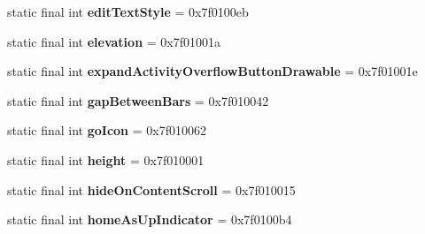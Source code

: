\begin{DoxyCompactItemize}
\item 
\hypertarget{classandroid_1_1support_1_1v7_1_1appcompat_1_1_r_1_1attr_adb21f96a96e592e622d373cf62cb5b55}{}static final int {\bfseries edit\+Text\+Style} = 0x7f0100eb\label{classandroid_1_1support_1_1v7_1_1appcompat_1_1_r_1_1attr_adb21f96a96e592e622d373cf62cb5b55}

\item 
\hypertarget{classandroid_1_1support_1_1v7_1_1appcompat_1_1_r_1_1attr_a857db0711c5ee6c5f31d51c0e1dcf793}{}static final int {\bfseries elevation} = 0x7f01001a\label{classandroid_1_1support_1_1v7_1_1appcompat_1_1_r_1_1attr_a857db0711c5ee6c5f31d51c0e1dcf793}

\item 
\hypertarget{classandroid_1_1support_1_1v7_1_1appcompat_1_1_r_1_1attr_a08db43c910c44c3cd8ba06573e44e88b}{}static final int {\bfseries expand\+Activity\+Overflow\+Button\+Drawable} = 0x7f01001e\label{classandroid_1_1support_1_1v7_1_1appcompat_1_1_r_1_1attr_a08db43c910c44c3cd8ba06573e44e88b}

\item 
\hypertarget{classandroid_1_1support_1_1v7_1_1appcompat_1_1_r_1_1attr_a37cf66ba61ecfae3c1d28ee79d9ef459}{}static final int {\bfseries gap\+Between\+Bars} = 0x7f010042\label{classandroid_1_1support_1_1v7_1_1appcompat_1_1_r_1_1attr_a37cf66ba61ecfae3c1d28ee79d9ef459}

\item 
\hypertarget{classandroid_1_1support_1_1v7_1_1appcompat_1_1_r_1_1attr_a817028431fb50ad70b0761d4813ee1dd}{}static final int {\bfseries go\+Icon} = 0x7f010062\label{classandroid_1_1support_1_1v7_1_1appcompat_1_1_r_1_1attr_a817028431fb50ad70b0761d4813ee1dd}

\item 
\hypertarget{classandroid_1_1support_1_1v7_1_1appcompat_1_1_r_1_1attr_ae2766034f35dee610b4cf8dbff1ce762}{}static final int {\bfseries height} = 0x7f010001\label{classandroid_1_1support_1_1v7_1_1appcompat_1_1_r_1_1attr_ae2766034f35dee610b4cf8dbff1ce762}

\item 
\hypertarget{classandroid_1_1support_1_1v7_1_1appcompat_1_1_r_1_1attr_af0d56ba3b5798b633d10f4b184f4d98f}{}static final int {\bfseries hide\+On\+Content\+Scroll} = 0x7f010015\label{classandroid_1_1support_1_1v7_1_1appcompat_1_1_r_1_1attr_af0d56ba3b5798b633d10f4b184f4d98f}

\item 
\hypertarget{classandroid_1_1support_1_1v7_1_1appcompat_1_1_r_1_1attr_a29f06cbfa3eb9526975250ade81dade5}{}static final int {\bfseries home\+As\+Up\+Indicator} = 0x7f0100b4\label{classandroid_1_1support_1_1v7_1_1appcompat_1_1_r_1_1attr_a29f06cbfa3eb9526975250ade81dade5}


\end{DoxyCompactItemize}
